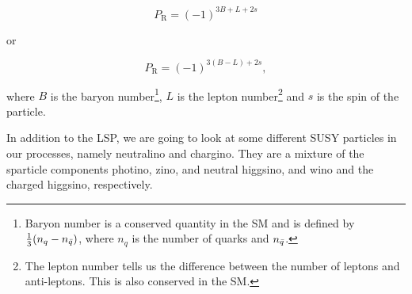 \begin{equation}
    \label{eq:Rparity1}
    P_{\mathrm {R} }=(-1)^{3B+L+2s}
\end{equation}

or

\begin{equation}
    \label{eq:Rparity2}
    P_{\mathrm {R} }=(-1)^{3(B-L)+2s},
\end{equation}

where $B$ is the baryon number\footnote{Baryon number is a conserved quantity in the SM and is defined by $\frac{1}{3}(n_q - n_{\Bar{q}})$, where $n_q$ is the number of quarks and $n_{\Bar{q}}$.}, $L$ is the lepton number\footnote{The lepton number tells us the difference between the number of leptons and anti-leptons. This is also conserved in the SM.} and $s$ is the spin of the particle. 

In addition to the LSP, we are going to look at some different SUSY particles in our processes, namely neutralino and chargino. They are a mixture of the sparticle components photino, zino, and neutral higgsino, and wino and the charged higgsino, respectively.



